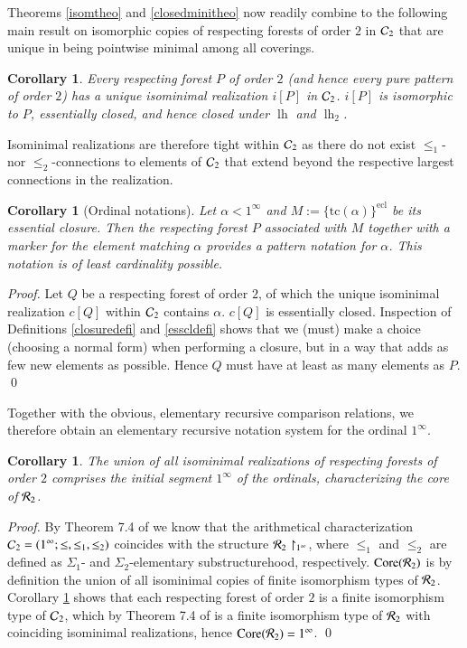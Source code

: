\documentclass[3p,10pt,times]{elsarticle}
\newcommand{\al}{\alpha}
\newcommand{\leo}{\le_1}
\newcommand{\lh}{{\operatorname{lh}}}
\newcommand{\Rtwo}{{{\cal R}_2}}
\newcommand{\Ctwo}{{{\cal C}_2}}
\newcommand{\Core}{{\operatorname{Core}}}
\newtheorem{cor}[theo]{Corollary}
\newcommand{\oneinf}{1^\infty}
\newcommand{\tc}{{\mathrm{tc}}}
\newcommand{\letwo}{\le_2}
\begin{document}
Theorems \ref{isomtheo} and \ref{closedminitheo} now readily combine to the following main result on isomorphic copies
of respecting forests of order $2$ in $\Ctwo$ that are unique in being pointwise minimal among all coverings.  
\begin{cor}\label{respforestcor}
Every respecting forest $P$ of order $2$ (and hence every pure pattern of order $2$) has a unique isominimal realization $i[P]$ in $\Ctwo$. 
$i[P]$ is isomorphic to $P$, essentially closed, and hence closed under $\lh$ and $\lh_2$.
\end{cor}

Isominimal realizations are therefore tight within $\Ctwo$ as there do not exist $\leo$- nor $\letwo$-connections to elements of $\Ctwo$
that extend beyond the respective largest connections in the realization.

\begin{cor}[Ordinal notations]\label{notationcor} 
Let $\al<\oneinf$ and $M:=\{\tc(\al)\}^{\operatorname{ecl}}$ be its essential closure.
Then the respecting forest $P$ associated with $M$ together with a marker for the element matching $\al$ provides 
a pattern notation for $\al$. This notation is of least cardinality possible.
\end{cor}
\begin{proof} Let $Q$ be a respecting forest of order $2$, of which the unique isominimal realization $c[Q]$ within $\Ctwo$ contains $\al$.
$c[Q]$ is essentially closed.
Inspection of Definitions \ref{closuredefi} and \ref{esscldefi} shows that we (must) make a choice (choosing a normal form) when performing 
a closure, but in a way that adds as few new elements as possible. Hence $Q$ must have at least as many elements as $P$.
\qed \end{proof}

Together with the obvious, elementary recursive comparison relations, we therefore obtain an elementary recursive notation system
for the ordinal $\oneinf$.
 
\begin{cor}
The union of all isominimal realizations of respecting forests of order $2$ comprises the initial segment $\oneinf$ of the ordinals,
characterizing the core of $\Rtwo$.
\end{cor}
\begin{proof} 
By Theorem 7.4 of \cite{CWc} we know that the arithmetical characterization $\Ctwo=(\oneinf;\le,\leo,\letwo)$ coincides with
the structure $\Rtwo\restriction_{\oneinf}$, where $\leo$ and $\letwo$ are defined as $\Sigma_1$- and $\Sigma_2$-elementary substructurehood,
respectively. $\Core(\Rtwo)$ is by definition the union of all isominimal copies of finite isomorphism types of $\Rtwo$.
Corollary \ref{respforestcor} shows that each respecting forest of order $2$ is a finite isomorphism type of $\Ctwo$, which by Theorem 7.4 
of \cite{CWc} is a finite isomorphism type of $\Rtwo$ with coinciding isominimal realizations, hence $\Core(\Rtwo)=\oneinf$. 
\qed \end{proof}
\end{document}
